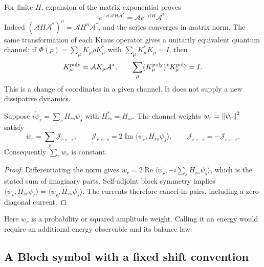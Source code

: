For finite $H$, expansion of the matrix exponential proves
\[
 e^{-it\mathcal A H\mathcal A^*}
   =\mathcal A e^{-itH}\mathcal A^*.
\]
Indeed $(\mathcal A H\mathcal A^*)^n=\mathcal A H^n\mathcal A^*$,
and the series converges in matrix norm. The same transformation of
each Kraus operator gives a unitarily equivalent quantum channel:
if $\Phi(\rho)=\sum_\mu K_\mu\rho K_\mu^*$ with
$\sum_\mu K_\mu^*K_\mu=I$, then
\[
 K_\mu^{\rm poly}=\mathcal A K_\mu\mathcal A^*,\qquad
 \sum_\mu(K_\mu^{\rm poly})^*K_\mu^{\rm poly}=I.
\]
This is a change of coordinates in a given channel. It does not supply
a new dissipative dynamics.

\begin{proposition}
\label{a-spectral-channel-current}
Suppose $i\dot\psi_r=\sum_sH_{rs}\psi_s$ with $H_{rs}^*=H_{sr}$.
The channel weights $w_r=\left\lVert\psi_r\right\rVert^2$ satisfy
\[
 \dot w_r=\sum_s\mathcal J_{r\leftarrow s},\qquad
 \mathcal J_{r\leftarrow s}
   =2\operatorname{Im}\langle\psi_r,H_{rs}\psi_s\rangle,
 \qquad
 \mathcal J_{r\leftarrow s}=-\mathcal J_{s\leftarrow r}.
\]
Consequently $\sum_rw_r$ is constant.
\end{proposition}
\begin{proof}
Differentiating the norm gives
$\dot w_r=2\operatorname{Re}\langle\psi_r,-i\sum_sH_{rs}\psi_s\rangle$,
which is the stated sum of imaginary parts. Self-adjoint block symmetry
implies
$\langle\psi_s,H_{sr}\psi_r\rangle
=\overline{\langle\psi_r,H_{rs}\psi_s\rangle}$.
The currents therefore cancel in pairs, including a zero diagonal current.
\end{proof}
Here $w_r$ is a probability or squared amplitude weight. Calling it an
energy would require an additional energy observable and its balance law.

\subsection{A Bloch symbol with a fixed shift convention}

